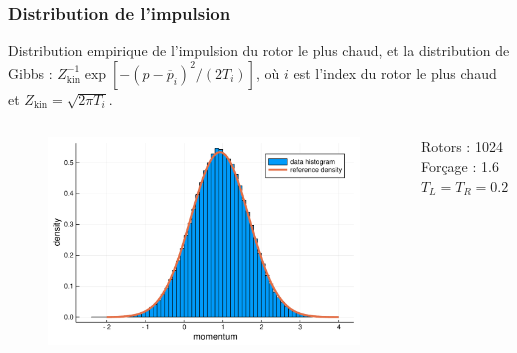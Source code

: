 \begin{frame}

    \frametitle{Distribution de l'impulsion}

    Distribution empirique de l'impulsion du rotor le plus chaud,
    et la distribution de Gibbs :
    $Z_\text{kin}^{-1} \exp[-(p - \overline p_i)^2 / (2T_i)]$,
    où $i$ est l'index du rotor le plus chaud et
    $Z_\text{kin} = \sqrt{2 \pi T_i}$.

    \begin{columns}

        \begin{column}{0.8\textwidth}
            \begin{figure}
                \includegraphics[scale=0.4]{plots/gibbs_momentum.pdf}
            \end{figure}
        \end{column}

        \begin{column}{0.2\textwidth}
            \scriptsize
            Rotors : 1024
            Forçage : 1.6
            $T_L = T_R = 0.2$
        \end{column}

    \end{columns}

\end{frame}


